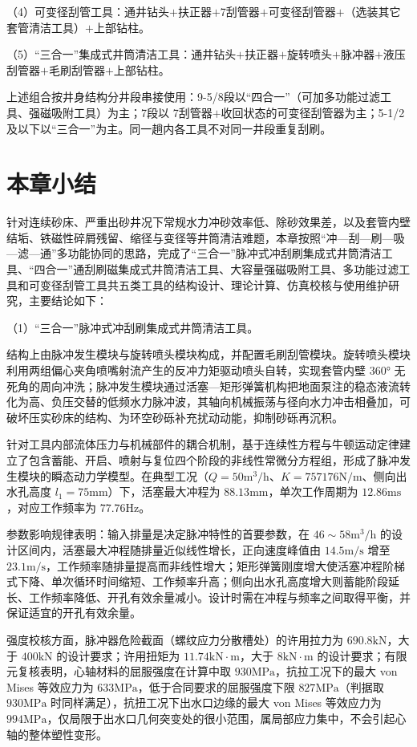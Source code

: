 （4）可变径刮管工具：通井钻头$+$扶正器$+$7\inch 刮管器$+$可变径刮管器$+$（选装其它套管清洁工具）$+$上部钻柱。

（5）“三合一”集成式井筒清洁工具：通井钻头$+$扶正器$+$旋转喷头$+$脉冲器$+$液压刮管器$+$毛刷刮管器$+$上部钻柱。

上述组合按井身结构分井段串接使用：9-5/8\inch 段以“四合一”（可加多功能过滤工具、强磁吸附工具）为主；7\inch 段以 7\inch 刮管器$+$收回状态的可变径刮管器为主；5-1/2\inch 及以下以“三合一”为主。同一趟内各工具不对同一井段重复刮刷。


\section{本章小结}

针对连续砂床、严重出砂井况下常规水力冲砂效率低、除砂效果差，以及套管内壁结垢、铁磁性碎屑残留、缩径与变径等井筒清洁难题，本章按照“冲—刮—刷—吸—滤—通”多功能协同的思路，完成了“三合一”脉冲式冲刮刷集成式井筒清洁工具、“四合一”通刮刷磁集成式井筒清洁工具、大容量强磁吸附工具、多功能过滤工具和可变径刮管工具共五类工具的结构设计、理论计算、仿真校核与使用维护研究，主要结论如下：

（1）“三合一”脉冲式冲刮刷集成式井筒清洁工具。

结构上由脉冲发生模块与旋转喷头模块构成，并配置毛刷刮管模块。旋转喷头模块利用两组偏心夹角喷嘴射流产生的反冲力矩驱动喷头自转，实现套管内壁 360° 无死角的周向冲洗；脉冲发生模块通过活塞—矩形弹簧机构把地面泵注的稳态液流转化为高、负压交替的低频水力脉冲波，其轴向机械振荡与径向水力冲击相叠加，可破坏压实砂床的结构、为环空砂砾补充扰动动能，抑制砂砾再沉积。
	
针对工具内部流体压力与机械部件的耦合机制，基于连续性方程与牛顿运动定律建立了包含蓄能、开启、喷射与复位四个阶段的非线性常微分方程组，形成了脉冲发生模块的瞬态动力学模型。在典型工况（$Q=50\mathrm{m^3/h}$、$K=757176\mathrm{N/m}$、侧向出水孔高度 $l_1=75\mathrm{mm}$）下，活塞最大冲程为 $88.13\mathrm{mm}$，单次工作周期为 $12.86\mathrm{ms}$，对应工作频率为 $77.76\mathrm{Hz}$。
	
参数影响规律表明：输入排量是决定脉冲特性的首要参数，在 $46\sim58\mathrm{m^3/h}$ 的设计区间内，活塞最大冲程随排量近似线性增长，正向速度峰值由 $14.5\mathrm{m/s}$ 增至 $23.1\mathrm{m/s}$，工作频率随排量提高而非线性增大；矩形弹簧刚度增大使活塞冲程阶梯式下降、单次循环时间缩短、工作频率升高；侧向出水孔高度增大则蓄能阶段延长、工作频率降低、开孔有效余量减小。设计时需在冲程与频率之间取得平衡，并保证适宜的开孔有效余量。

强度校核方面，脉冲器危险截面（螺纹应力分散槽处）的许用拉力为 $690.8\mathrm{kN}$，大于 $400\mathrm{kN}$ 的设计要求；许用扭矩为 $11.74\mathrm{kN\cdot m}$，大于 $8\mathrm{kN\cdot m}$ 的设计要求；有限元复核表明，心轴材料的屈服强度在计算中取 $930\mathrm{MPa}$，抗拉工况下的最大 von Mises 等效应力为 $633\mathrm{MPa}$，低于合同要求的屈服强度下限 $827\mathrm{MPa}$（判据取 $930\mathrm{MPa}$ 时同样满足），抗扭工况下出水口边缘的最大 von Mises 等效应力为 $994\mathrm{MPa}$，仅局限于出水口几何突变处的很小范围，属局部应力集中，不会引起心轴的整体塑性变形。
	
